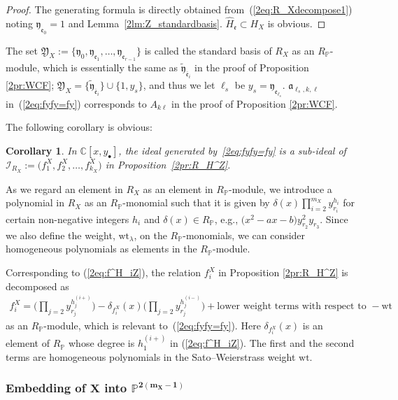 \documentclass[10pt,a4paper]{amsart}
\def\CC{{\mathbb C}}
\def\PP{{\mathbb P}}
\def\cI{{\mathcal I}}
\def\fY{{\mathfrak Y}}
\def\fa{{\mathfrak a}}
\def\fe{{\mathfrak e}}
\def\fy{{\mathfrak y}}
\def\tfy{{\widetilde{\mathfrak y}}}
\def\Bfe{{\overline{\mathfrak e}}}
\def\hH{{\widehat H}}
\def\wt{{\mathrm {wt}}}
\numberwithin{equation}{section}
\newtheorem{Corollary}[Theorem]{Corollary}
\begin{document}
\begin{proof}The generating formula is directly obtained from~(\ref{2eq:R_Xdecompose1}) noting $\fy_{\fe_0}=1$ and Lemma~\ref{2lm:Z_standardbasis}.
 $\hH_{\fe}\subset H_X$ is obvious.
\end{proof}

The set $\fY_X:=\{\fy_{0}, \fy_{\fe_1}, \dots, \fy_{\fe_{r-1}}\}$ is called the standard basis of $R_X$ as an $R_\PP$-module, which is essentially the same as $\tfy_{\Bfe_i}$ in the proof of Proposition \ref{2pr:WCF}; $\fY_X=\{\tfy_{\Bfe_i}\}\cup\{1,y_s\}$, and thus we let $\ell_s$ be $y_s=\fy_{\fe_{\ell_s}}$.
$\fa_{\ell_s,k,\ell}$ in~(\ref{2eq:fyfy=fy}) corresponds to $A_{k\ell}$ in the proof of Proposition \ref{2pr:WCF}.

The following corollary is obvious:
\begin{Corollary}\label{2cr:Ideal_fyfy}
In $\CC[x, y_\bullet]$, the ideal generated by~\eqref{2eq:fyfy=fy} is a sub-ideal of $\cI_{R_X}:=\big(f_1^X, f_2^X, \dots,\allowbreak f_{k_X}^X\big)$ in Proposition~{\rm \ref{2pr:R_H^Z}}.
\end{Corollary}

As we regard an element in $R_X$ as an element in $R_\PP$-module, we introduce a polynomial in $R_X$ as an $R_\PP$-monomial such that it is given by $\delta(x) \prod_{i=2}^{m_X} y_{r_i}^{h_i}$ for certain non-negative integers $h_i$ and $\delta(x)\in R_\PP$, e.g., $\big(x^2-a x-b\big) y_{r_2}^2 y_{r_3}$.
Since we also define the weight, $\wt_\lambda$, on the $R_\PP$-monomials, we can consider homogeneous polynomials as elements in the $R_\PP$-module.

\begin{Remark}\label{2rk:RP-moduleRX}
Corresponding to (\ref{2eq:f^H_iZ}), the relation $f^X_i$ in Proposition \ref{2pr:R_H^Z} is decomposed as
\begin{gather*}
f^X_i =
\bigg(
\prod_{j=2} y_{r_j}^{h_j^{(i+)}}
\bigg)
-\delta_{f^X_i}(x)\bigg(
\prod_{j=2} y_{r_j}^{h_j^{(i-)}}
\bigg)+ \text{lower weight terms with respect to }{-}\wt
\end{gather*}
as an $R_\PP$-module, which is relevant to~(\ref{2eq:fyfy=fy}).
Here $\delta_{f^X_i}(x)$ is an element of $R_\PP$ whose degree is $h_1^{(i+)}$ in (\ref{2eq:f^H_iZ}).
The first and the second terms are homogeneous polynomials in the Sato--Weierstrass weight $\wt$.
\end{Remark}

\subsubsection[Embedding of X into P\^{}\{2(m\_X-1)\}]{Embedding of $\boldsymbol{X}$ into $\boldsymbol{\PP^{2(m_X-1)}}$}\label{2sssc:X_to_PP^m}
\end{document}
